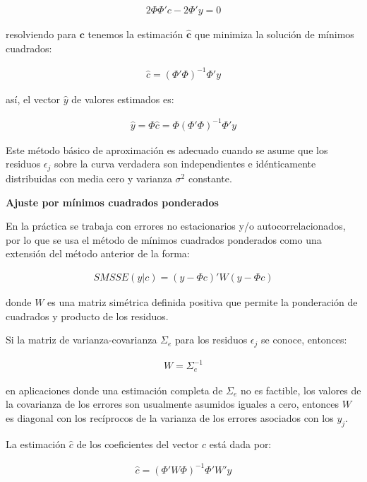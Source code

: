 \documentclass[
]{book}
\begin{document}
\begin{align*}
    2\Phi \Phi'c-2\Phi'y=0
\end{align*}

resolviendo para \(\textbf{c}\) tenemos la estimación \(\hat{\textbf{c}}\) que minimiza la solución de mínimos cuadrados:

\begin{align*}
    \hat{c}=(\Phi'\Phi)^{-1}\Phi'y
\end{align*}

así, el vector \(\hat{y}\) de valores estimados es:

\begin{align*}
    \hat{y}=\Phi \hat{c}=\Phi(\Phi'\Phi)^{-1}\Phi'y
\end{align*}

Este método básico de aproximación es adecuado cuando se asume que los residuos \(\epsilon_j\) sobre la curva verdadera son independientes e idénticamente distribuidas con media cero y varianza \(\sigma^2\) constante.

\textbf{Ajuste por mínimos cuadrados ponderados}

En la práctica se trabaja con errores no estacionarios y/o autocorrelacionados, por lo que se usa el método de mínimos cuadrados ponderados como una extensión del método anterior de la forma:

\begin{align*}
    SMSSE(y|c)=(y-\Phi c)'W(y-\Phi c)
\end{align*}

donde \(W\) es una matriz simétrica definida positiva que permite la ponderación de cuadrados y producto de los residuos.

Si la matriz de varianza-covarianza \(\Sigma_e\) para los residuos \(\epsilon_j\) se conoce, entonces:

\begin{align*}
    W=\Sigma_e^{-1}
\end{align*}

en aplicaciones donde una estimación completa de \(\Sigma_e\) no es factible, los valores de la covarianza de los errores son usualmente asumidos iguales a cero, entonces \(W\) es diagonal con los recíprocos de la varianza de los errores asociados con los \(y_j\).

La estimación \(\hat{c}\) de los coeficientes del vector \(c\) está dada por:

\begin{align*}
    \hat{c}=(\Phi'W\Phi)^{-1}\Phi'W'y
\end{align*}
\end{document}

